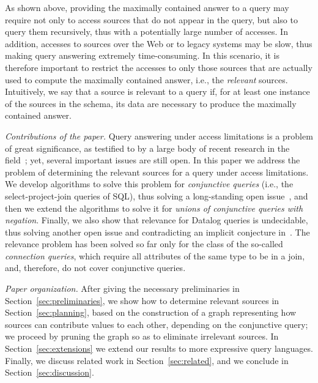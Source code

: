 As shown above, providing the maximally contained answer to a query may require not only to access sources that do not appear in the query, but also to query them recursively, thus with a potentially large number of accesses.
In addition, accesses to sources over the Web or to legacy systems may be slow, thus making query answering extremely time-consuming.  In this scenario, it is therefore important to restrict the accesses to only those sources that are actually used to compute the maximally contained answer, i.e., the \emph{relevant} sources.
Intuitively, we say that a source is relevant to a query if, for at least one instance of the sources in the schema, its data are necessary to produce the maximally contained answer.

\vskip 0.1cm
\emph{Contributions of the paper.}
Query answering under access limitations is a problem of great significance, as testified to by a large body of recent research in the
field~\cite{LiCh00,LiCh01b,LiCh01,Li03,DBLP:journals/jcss/MillsteinHF03,NaLu04,LuNa04a,YaKC06,Deutsch:2007lr,CaMa:ICDE2008,BCDM:VLDB2008};
yet, several important issues are still open.
In this paper we address the problem of determining the relevant sources for a query under access limitations.
We develop algorithms to solve this problem for \emph{conjunctive queries} (i.e., the select-project-join queries of SQL), thus solving a long-standing open issue~\cite{LiCh01b},
and then we extend the algorithms to solve it for \emph{unions of conjunctive queries with negation}.
Finally, we also show that relevance for Datalog queries is undecidable, thus solving another open issue and contradicting an implicit conjecture in~\cite{LiCh01b}.
%
%
The relevance problem has been solved so far only for the class of the so-called \emph{connection queries}, which require all attributes of the same type to be in a join, and, therefore, do not cover conjunctive queries.
%


\vskip 0.1cm
\emph{Paper organization.}
After giving the necessary preliminaries in Section~\ref{sec:preliminaries}, we show how to determine relevant sources in Section~\ref{sec:planning}, based on the construction of a graph representing how sources can contribute values to each other, depending on the conjunctive query; we proceed by pruning the graph so as to eliminate irrelevant sources.
In Section~\ref{sec:extensions} we extend our results to more expressive query languages.
Finally, we discuss related work in Section~\ref{sec:related}, and we conclude in Section~\ref{sec:discussion}.
